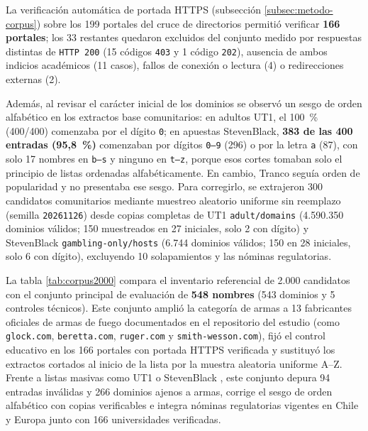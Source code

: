 \documentclass[10pt,a4paper]{article}
\begin{document}
La verificación automática de portada HTTPS (subsección \ref{subsec:metodo-corpus}) sobre los 199 portales del cruce de directorios permitió verificar \textbf{166 portales}; los 33 restantes quedaron excluidos del conjunto medido por respuestas distintas de \texttt{HTTP 200} (15 códigos \texttt{403} y 1 código \texttt{202}), ausencia de ambos indicios académicos (11 casos), fallos de conexión o lectura (4) o redirecciones externas (2).

Además, al revisar el carácter inicial de los dominios se observó un sesgo de orden alfabético en los extractos base comunitarios: en adultos UT1, el 100~\% (400/400) comenzaba por el dígito \texttt{0}; en apuestas StevenBlack, \textbf{383 de las 400 entradas (95,8~\%)} comenzaban por dígitos \texttt{0--9} (296) o por la letra \texttt{a} (87), con solo 17 nombres en \texttt{b--s} y ninguno en \texttt{t--z}, porque esos cortes tomaban solo el principio de listas ordenadas alfabéticamente. En cambio, Tranco seguía orden de popularidad y no presentaba ese sesgo. Para corregirlo, se extrajeron 300 candidatos comunitarios mediante muestreo aleatorio uniforme sin reemplazo (semilla \texttt{20261126}) desde copias completas de UT1 \texttt{adult/domains} (4.590.350 dominios válidos; 150 muestreados en 27 iniciales, solo 2 con dígito) y StevenBlack \texttt{gambling-only/hosts} (6.744 dominios válidos; 150 en 28 iniciales, solo 6 con dígito), excluyendo 10 solapamientos y las nóminas regulatorias.

La tabla \ref{tab:corpus2000} compara el inventario referencial de 2.000 candidatos con el conjunto principal de evaluación de \textbf{548 nombres} (543 dominios y 5 controles técnicos). Este conjunto amplió la categoría de armas a 13 fabricantes oficiales de armas de fuego documentados en el repositorio del estudio (como \texttt{glock.com}, \texttt{beretta.com}, \texttt{ruger.com} y \texttt{smith-wesson.com}), fijó el control educativo en los 166 portales con portada HTTPS verificada y sustituyó los extractos cortados al inicio de la lista por la muestra aleatoria uniforme A--Z. Frente a listas masivas como UT1 o StevenBlack \cite{plonka2025}, este conjunto depura 94 entradas inválidas y 266 dominios ajenos a armas, corrige el sesgo de orden alfabético con copias verificables e integra nóminas regulatorias vigentes en Chile y Europa junto con 166 universidades verificadas.
\end{document}
